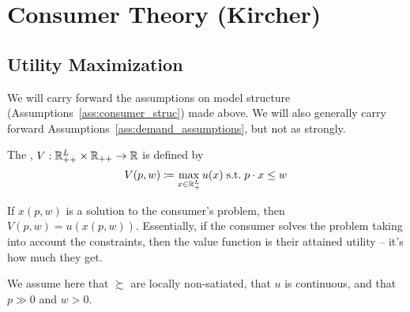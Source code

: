\documentclass[12pt]{article}
\begin{document}
\newpage
\section{Consumer Theory (Kircher)}\label{sec:kircher}

\subsection{Utility Maximization}

\begin{remark}
	We will carry forward the assumptions on model structure (Assumptions~\ref{ass:consumer_struc}) made above. We will also generally carry forward Assumptions~\ref{ass:demand_assumptions}, but not as strongly.
\end{remark}

\begin{definition}
	The , $V: \mathbb{R}^L_{++} \times \mathbb{R}_{++} \to \mathbb{R}$ is defined by
	\[
	V(p,w) \coloneqq \max_{x \in \mathbb{R}^L_+} u(x) \;\text{s.t.}\; p\cdot x \le w
	\]
\end{definition}
\begin{remark}
	If $x(p,w)$ is a solution to the consumer's problem, then $V(p,w) = u(x(p,w))$. Essentially, if the consumer solves the problem taking into account the constraints, then the value function is their attained utility -- it's how much they get.
\end{remark}
\begin{assumption}\label{ass:consumer_pref_assumptions}
	We assume here that $\succsim$ are locally non-satiated, that $u$ is continuous, and that $p \gg 0$ and $w > 0$.
\end{assumption}
\end{document}
